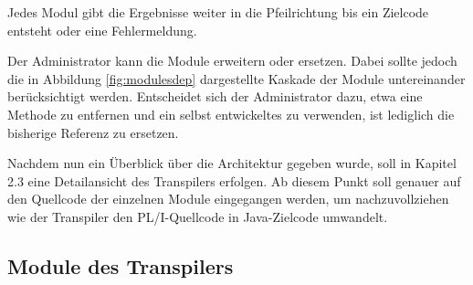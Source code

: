 Jedes Modul gibt die Ergebnisse weiter in die Pfeilrichtung bis ein Zielcode entsteht oder eine Fehlermeldung.

Der Administrator kann die Module erweitern oder ersetzen.
Dabei sollte jedoch die in Abbildung \ref{fig:modulesdep} dargestellte Kaskade der Module untereinander berücksichtigt werden.
Entscheidet sich der Administrator dazu, etwa eine Methode zu entfernen und ein selbst entwickeltes zu verwenden, ist lediglich die bisherige 
Referenz zu ersetzen.

Nachdem nun ein Überblick über die Architektur gegeben wurde, soll in Kapitel 2.3 eine Detailansicht des Transpilers erfolgen.
Ab diesem Punkt soll genauer auf den Quellcode der einzelnen Module eingegangen werden, um nachzuvollziehen wie der Transpiler den PL/I-Quellcode
in Java-Zielcode umwandelt.


 \pagebreak
\subsection{Module des Transpilers}

